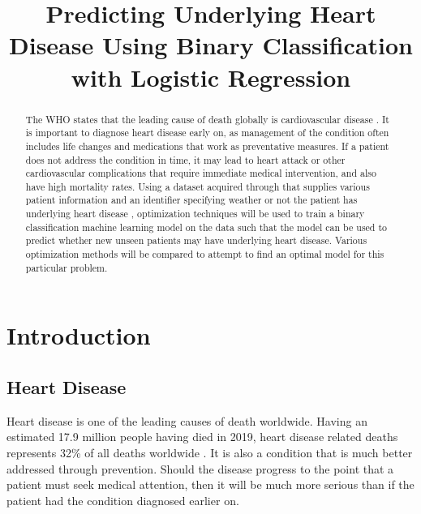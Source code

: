 \documentclass[12pt,conference]{IEEEtran}
\begin{document}
\onecolumn
\title{ Predicting Underlying Heart Disease Using Binary Classification with Logistic Regression }
\author{
}
\maketitle
\thispagestyle{plain}
\pagestyle{plain}
\begin{abstract}
The WHO states that the leading cause of death globally is cardiovascular disease \cite{who}. It is important to diagnose heart disease early on, as management of the condition often includes life changes and medications that work as preventative measures. If a patient does not address the condition in time, it may lead to heart attack or other cardiovascular complications that require immediate medical intervention, and also have high mortality rates. Using a dataset acquired through  that supplies various patient information and an identifier specifying weather or not the patient has underlying heart disease \cite{kaggle}, optimization techniques will be used to train a binary classification machine learning model on the data such that the model can be used to predict whether new unseen patients may have underlying heart disease. Various optimization methods will be compared to attempt to find an optimal model for this particular problem.
\end{abstract}

\section{Introduction}
\subsection{Heart Disease}
Heart disease is one of the leading causes of death worldwide. Having an estimated 17.9 million people having died in 2019, heart disease related deaths represents 32\% of all deaths worldwide \cite{who}. It is also a condition that is much better addressed through prevention. Should the disease progress to the point that a patient must seek medical attention, then it will be much more serious than if the patient had the condition diagnosed earlier on. 
\end{document}
